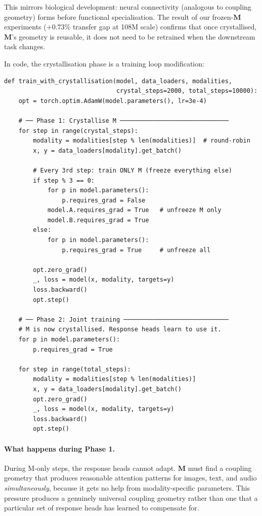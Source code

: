 \documentclass[11pt, a4paper]{article}
\newcommand{\M}{\mathbf{M}}
\theoremstyle{remark}
\begin{document}
This mirrors biological development: neural connectivity (analogous to coupling geometry) forms before functional specialisation.
The result of our frozen-$\M$ experiments ($+0.73\%$ transfer gap at 108M scale) confirms that once crystallised, $\M$'s geometry is reusable, it does not need to be retrained when the downstream task changes.

In code, the crystallisation phase is a training loop modification:

\begin{lstlisting}[caption={M-crystallisation: force M to discover universal geometry before specialisation.}]
def train_with_crystallisation(model, data_loaders, modalities,
                               crystal_steps=2000, total_steps=10000):
    opt = torch.optim.AdamW(model.parameters(), lr=3e-4)

    # ── Phase 1: Crystallise M ──────────────────────────────
    for step in range(crystal_steps):
        modality = modalities[step % len(modalities)]  # round-robin
        x, y = data_loaders[modality].get_batch()

        # Every 3rd step: train ONLY M (freeze everything else)
        if step % 3 == 0:
            for p in model.parameters():
                p.requires_grad = False
            model.A.requires_grad = True   # unfreeze M only
            model.B.requires_grad = True
        else:
            for p in model.parameters():
                p.requires_grad = True     # unfreeze all

        opt.zero_grad()
        _, loss = model(x, modality, targets=y)
        loss.backward()
        opt.step()

    # ── Phase 2: Joint training ─────────────────────────────
    # M is now crystallised. Response heads learn to use it.
    for p in model.parameters():
        p.requires_grad = True

    for step in range(total_steps):
        modality = modalities[step % len(modalities)]
        x, y = data_loaders[modality].get_batch()
        opt.zero_grad()
        _, loss = model(x, modality, targets=y)
        loss.backward()
        opt.step()
\end{lstlisting}

\paragraph{What happens during Phase 1.}
During M-only steps, the response heads cannot adapt.
$\M$ must find a coupling geometry that produces reasonable attention patterns for images, text, and audio \emph{simultaneously}, because it gets no help from modality-specific parameters.
This pressure produces a genuinely universal coupling geometry rather than one that a particular set of response heads has learned to compensate for.
\end{document}
